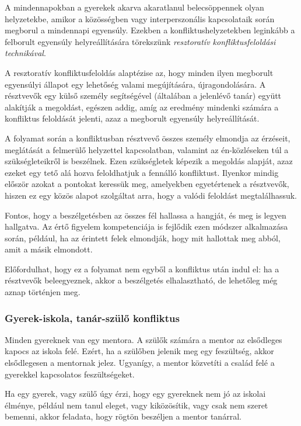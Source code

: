 A mindennapokban a gyerekek akarva akaratlanul belecsöppennek olyan
helyzetekbe, amikor a közösségben vagy interperszonális kapcsolataik során
megborul a mindennapi egyensúly. Ezekben a konfliktushelyzetekben leginkább a
felborult egyensúly helyreállítására törekszünk \emph{resztoratív
      konfliktusfeloldási
      technikával}.

A resztoratív konfliktusfeloldás alaptézise az, hogy minden ilyen megborult
egyensúlyi állapot egy lehetőség valami megújítására, újragondolására. A
résztvevők egy külső személy segítségével (általában a jelenlévő tanár) együtt
alakítják
a megoldást, egészen addig, amíg az eredmény mindenki számára a konfliktus
feloldását jelenti, azaz a megborult egyensúly helyreállítását.

A folyamat során a konfliktusban résztvevő összes személy elmondja az érzéseit,
meglátását a felmerülő helyzettel kapcsolatban, valamint az én-közléseken túl a
szükségleteikről is beszélnek. Ezen szükségletek képezik a megoldás alapját,
azaz ezeket egy tető alá hozva feloldhatjuk a fennálló konfliktust. Ilyenkor
mindig először azokat a pontokat keressük meg, amelyekben egyetértenek a
résztvevők, hiszen ez egy közös alapot szolgáltat arra, hogy a valódi feloldást
megtalálhassuk.

Fontos, hogy a beszélgetésben az összes fél hallassa a hangját, és meg is
legyen
hallgatva. Az értő figyelem kompetenciája is fejlődik ezen módszer alkalmazása
során, például, ha az érintett felek elmondják, hogy mit hallottak meg abból,
amit a másik elmondott.

Előfordulhat, hogy ez a folyamat nem egyből a konfliktus után indul el: ha a
résztvevők beleegyeznek, akkor a beszélgetés elhalasztható, de lehetőleg még
aznap történjen meg.

\subsubsection{Gyerek-iskola, tanár-szülő
      konfliktus}

Minden gyereknek van egy mentora. A szülők számára a mentor az
elsődleges kapocs az iskola felé. Ezért, ha a szülőben jelenik meg egy
feszültség, akkor elsődlegesen a mentornak jelez. Ugyanígy, a mentor
közvetíti a család felé a gyerekkel kapcsolatos feszültségeket.

Ha egy gyerek, vagy szülő úgy érzi, hogy egy gyereknek nem jó az iskolai
élménye, például nem tanul eleget, vagy kiközösítik, vagy csak nem
szeret bemenni, akkor feladata, hogy rögtön beszéljen a mentor tanárral.

